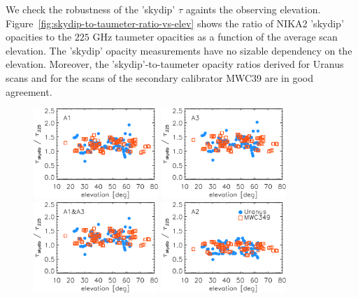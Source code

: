 We check the robustness of the 'skydip' $\tau$ againts the
observing elevation. 
Figure~\ref{fig:skydip-to-taumeter-ratio-vs-elev} shows the ratio of NIKA2
'skydip' opacities to the $225$ GHz taumeter opacities as a function of
the average scan elevation. The 'skydip' opacity measurements have no
sizable dependency on the elevation. Moreover, the
'skydip'-to-taumeter opacity ratios derived for Uranus scans and for
the scans of the secondary calibrator MWC39 are in good agreement.

\begin{figure}[ht!]
  \begin{center}
    \includegraphics[clip=true, trim={0, -0.3cm, -0.3cm, 0}, width=0.42\textwidth]{Figures/Opacity/Opacity_skydip_to_taumeter_vs_elev_a1.pdf}
    \includegraphics[clip=true, trim={0, -0.3cm, -0.3cm, 0}, width=0.42\textwidth]{Figures/Opacity/Opacity_skydip_to_taumeter_vs_elev_a3.pdf}
    \includegraphics[clip=true, trim={0, -0.3cm, -0.3cm, 0}, width=0.42\textwidth]{Figures/Opacity/Opacity_skydip_to_taumeter_vs_elev_1mm.pdf}
    \includegraphics[clip=true, trim={0, -0.3cm, -0.3cm, 0}, width=0.42\textwidth]{Figures/Opacity/Opacity_skydip_to_taumeter_vs_elev_a2.pdf}

\end{center}
\end{figure}
